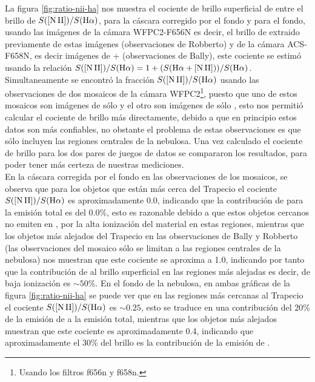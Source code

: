 La figura \ref{fig:ratio-nii-ha} nos muestra el cociente de brillo superficial de \nii{} entre el brillo de \ha{} \(S(\mathrm{[N\,II]}{})/S(\mathrm{H}\alpha{})\), para la cáscara corregido por el fondo y para el fondo, usando las imágenes de la cámara WFPC2-F656N es decir, el brillo de \ha{} extraido previamente de estas imágenes (observaciones de Robberto) y de la cámara ACS-F658N, es decir imágenes de \ha{}+\nii{} (observaciones de Bally), este cociente se estimó usando la relación \(S(\mathrm{[N\,II]}{})/S(\mathrm{H}\alpha{}) = 1 + (S(\mathrm{H}\alpha{}+\mathrm{[N\,II]}{}))/S(\mathrm{H}\alpha{})\). Simultaneamente se encontró la fracción \(S(\mathrm{[N\,II]}{})/S(\mathrm{H}\alpha{})\) usando las observaciones de dos mosaicos de la cámara WFPC2\footnote{Usando los filtros f656n y f658n.}, puesto que uno de estos mosaicos son imágenes de sólo  \ha{} y el otro son imágenes de sólo \nii{}, esto nos permitió  calcular el cociente de brillo más directamente, debido a que en principio estos datos son más confiables, no obstante el problema de estas observaciones es que sólo incluyen las regiones centrales de la nebulosa. Una vez calculado el cociente de brillo para los dos pares de juegos de datos se compararon los resultados, para poder tener más certeza de nuestras mediciones.\\

En la cáscara corregida por el fondo en las observaciones de los mosaicos, se observa que para los objetos que están más cerca del Trapecio el cociente \(S(\mathrm{[N\,II]}{})/S(\mathrm{H}\alpha{})\) es aproximadamente 0.0, indicando que la contribución de \nii{} para la emisión total es del \(0.0\%\), esto es razonable debido a que estos objetos cercanos no emiten en \nii{}, por la alta ionización del material en estas regiones, mientras que los objetos más alejados del Trapecio en las observaciones de Bally y Robberto (las observaciones del mosaico sólo se limitan a las regiones centrales de la nebulosa) nos muestran que este cociente se aproxima a 1.0, indicando por tanto que la contribución de \nii{} al brillo superficial en las regiones más alejadas es decir, de baja ionización es \(\sim 50\%\). En el fondo de la nebulosa, en ambas gráficas de la figura \ref{fig:ratio-nii-ha} se puede ver que en las regiones más cercanas al Trapecio  el cociente \(S(\mathrm{[N\,II]}{})/S(\mathrm{H}\alpha{})\) es \(\sim 0.25\), esto se traduce en una contribución del \(20\%\) de la emisión de \nii{} a la emisión total, mientras que los objetos más alejados muestran que este cociente es aproximadamente 0.4, indicando que aproximadamente el 30\(\%\) del brillo  es la contribución de la emisión de \nii{}.     \\

